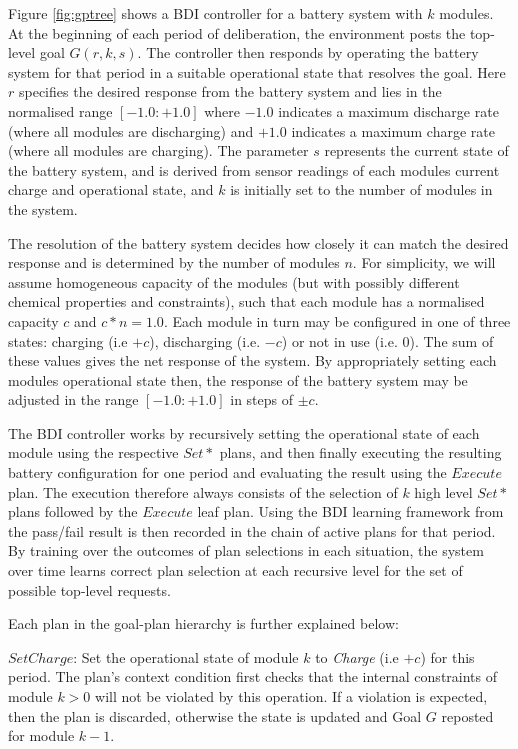 Figure \ref{fig:gptree} shows a BDI controller for a battery system with $k$ modules. At the beginning of each period of deliberation, the environment posts the top-level goal $G(r,k,s)$. The controller then responds by operating the battery system for that period in a suitable operational state that resolves the goal. Here $r$ specifies the desired response from the battery system and lies in the normalised range $[-1.0:+1.0]$ where $-1.0$ indicates a maximum discharge rate (where all modules are discharging) and $+1.0$ indicates a maximum charge rate (where all modules are charging). The parameter $s$ represents the current state of the battery system, and is derived from sensor readings of each modules current charge and operational state, and $k$ is initially set to the number of modules in the system. 

The resolution of the battery system decides how closely it can match the desired response and is determined by the number of modules $n$. For simplicity, we will assume homogeneous capacity of the modules (but with possibly different chemical properties and constraints), such that each module has a normalised capacity $c$ and $c*n=1.0$. Each module in turn may be configured in one of three states: charging (i.e $+c$), discharging (i.e. $-c$) or not in use (i.e. $0$). The sum of these values gives the net response of the system. By appropriately setting each modules operational state then, the response of the battery system may be adjusted in the range $[-1.0:+1.0]$ in steps of $\pm c$.

The BDI controller works by recursively setting the operational state of each module using the respective $Set*$ plans, and then finally executing the resulting battery configuration for one period and evaluating the result using the $Execute$ plan. The execution therefore always consists of the selection of $k$ high level $Set*$ plans followed by the $Execute$ leaf plan. Using the BDI learning framework from \cite{Singh:RAS10} the pass/fail result is then recorded in the chain of active plans for that period. By training over the outcomes of plan selections in each situation, the system over time learns correct plan selection at each recursive level for the set of possible top-level requests. 

Each plan in the goal-plan hierarchy is further explained below:

$SetCharge$: Set the operational state of module $k$ to {\em Charge} (i.e $+c$) for this period. The plan's context condition first checks that the internal constraints of module $k>0$ will not be violated by this operation. If a violation is expected, then the plan is discarded, otherwise the state is updated and Goal $G$ reposted for module $k-1$.

